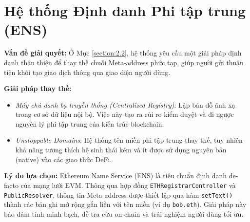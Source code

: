 \documentclass[../DoAn.tex]{subfiles}
\begin{document}
\section{Hệ thống Định danh Phi tập trung (ENS)}
\label{sec:3.5}
\textbf{Vấn đề giải quyết:} Ở Mục \ref{section:2.2}, hệ thống yêu cầu một giải pháp định danh thân thiện để thay thế chuỗi Meta-address phức tạp, giúp người gửi thuận tiện khởi tạo giao dịch thông qua giao diện người dùng.

\textbf{Giải pháp thay thế:}
\begin{itemize}
    \item \textit{Máy chủ danh bạ truyền thống (Centralized Registry)}: Lập bản đồ ánh xạ trong cơ sở dữ liệu nội bộ. Việc này tạo ra rủi ro kiểm duyệt và đi ngược nguyên lý phi tập trung của kiến trúc blockchain.
    \item \textit{Unstoppable Domains}: Hệ thống tên miền phi tập trung thay thế, tuy nhiên khả năng tương thích hệ sinh thái kém và ít được sử dụng nguyên bản (native) vào các giao thức DeFi.
\end{itemize}

\textbf{Lý do lựa chọn:} Ethereum Name Service (ENS) \cite{ens} là tiêu chuẩn định danh de-facto của mạng lưới EVM. Thông qua hợp đồng \texttt{ETHRegistrarController} và \texttt{PublicResolver}, thông tin Meta-address được thiết lập qua hàm \texttt{setText()} thành các bản ghi mở rộng gắn liền với tên miền (ví dụ \texttt{bob.eth}). Giải pháp này bảo đảm tính minh bạch, dễ tra cứu on-chain và trải nghiệm người dùng tối ưu.
\end{document}
